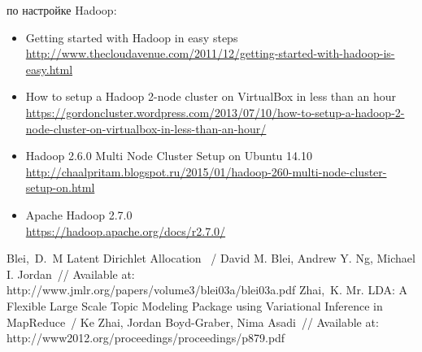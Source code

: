  по настройке Hadoop:\vspace*{-0.5em}
\begin{itemize}\itemsep-5pt
    \item Getting started with Hadoop in easy steps\\\footnotesize
        \url{http://www.thecloudavenue.com/2011/12/getting-started-with-hadoop-is-easy.html}
        \normalsize
    \item How to setup a Hadoop 2-node cluster on VirtualBox in less than an hour\\\footnotesize
        \url{https://gordoncluster.wordpress.com/2013/07/10/how-to-setup-a-hadoop-2-
        node-cluster-on-virtualbox-in-less-than-an-hour/}
        \normalsize
    \item Hadoop 2.6.0 Multi Node Cluster Setup on Ubuntu 14.10\\\footnotesize
        \url{http://chaalpritam.blogspot.ru/2015/01/hadoop-260-multi-node-cluster-setup-on.html}
        \normalsize
    \item Apache Hadoop 2.7.0\\\footnotesize
        \url{https://hadoop.apache.org/docs/r2.7.0/}
        \normalsize
\end{itemize}

\newpage

\renewcommand{\bibname}{Список используемой литературы}
\begin{thebibliography}{10}
     Blei,~D.~M Latent Dirichlet Allocation ~/ David M. Blei, Andrew Y. Ng, 
        Michael I. Jordan~// Available at: http://www.jmlr.org/papers/volume3/blei03a/blei03a.pdf
     Zhai,~K. Mr. LDA: A Flexible Large Scale Topic Modeling Package using Variational 
        Inference in MapReduce~/ Ke Zhai, Jordan Boyd-Graber, Nima Asadi~//
        Available at: http://www2012.org/proceedings/proceedings/p879.pdf
\end{thebibliography}